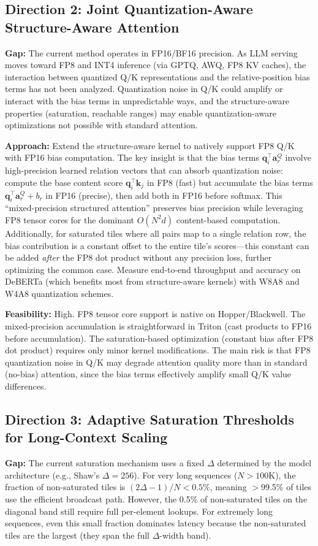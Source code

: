 \documentclass[11pt,a4paper]{article}
\begin{document}
\subsection{Direction 2: Joint Quantization-Aware Structure-Aware Attention}
\textbf{Gap:} The current method operates in FP16/BF16 precision. As LLM serving moves toward FP8 and INT4 inference (via GPTQ, AWQ, FP8 KV caches), the interaction between quantized Q/K representations and the relative-position bias terms has not been analyzed. Quantization noise in Q/K could amplify or interact with the bias terms in unpredictable ways, and the structure-aware properties (saturation, reachable ranges) may enable quantization-aware optimizations not possible with standard attention.

\textbf{Approach:} Extend the structure-aware kernel to natively support FP8 Q/K with FP16 bias computation. The key insight is that the bias terms $\mathbf{q}_i^\top \mathbf{a}^Q_r$ involve high-precision learned relation vectors that can absorb quantization noise: compute the base content score $\mathbf{q}_i^\top \mathbf{k}_j$ in FP8 (fast) but accumulate the bias terms $\mathbf{q}_i^\top \mathbf{a}^Q_r + b_r$ in FP16 (precise), then add both in FP16 before softmax. This ``mixed-precision structured attention'' preserves bias precision while leveraging FP8 tensor cores for the dominant $O(N^2 d)$ content-based computation. Additionally, for saturated tiles where all pairs map to a single relation row, the bias contribution is a constant offset to the entire tile's scores---this constant can be added \emph{after} the FP8 dot product without any precision loss, further optimizing the common case. Measure end-to-end throughput and accuracy on DeBERTa (which benefits most from structure-aware kernels) with W8A8 and W4A8 quantization schemes.

\textbf{Feasibility:} High. FP8 tensor core support is native on Hopper/Blackwell. The mixed-precision accumulation is straightforward in Triton (cast products to FP16 before accumulation). The saturation-based optimization (constant bias after FP8 dot product) requires only minor kernel modifications. The main risk is that FP8 quantization noise in Q/K may degrade attention quality more than in standard (no-bias) attention, since the bias terms effectively amplify small Q/K value differences.

\subsection{Direction 3: Adaptive Saturation Thresholds for Long-Context Scaling}
\textbf{Gap:} The current saturation mechanism uses a fixed $\Delta$ determined by the model architecture (e.g., Shaw's $\Delta{=}256$). For very long sequences ($N > 100$K), the fraction of non-saturated tiles is $(2\Delta{-}1)/N < 0.5\%$, meaning $>$99.5\% of tiles use the efficient broadcast path. However, the 0.5\% of non-saturated tiles on the diagonal band still require full per-element lookups. For extremely long sequences, even this small fraction dominates latency because the non-saturated tiles are the largest (they span the full $\Delta$-width band).
\end{document}
